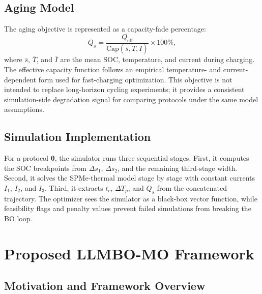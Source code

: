 \documentclass[journal]{IEEEtran}
\newcommand{\btheta}{\boldsymbol{\theta}}
\begin{document}
\subsection{Aging Model}

The aging objective is represented as a capacity-fade percentage:
\begin{equation}
Q_s=\frac{Q_{\mathrm{eff}}}
{\mathrm{Cap}(\bar{s},\bar{T},\bar{I})}\times 100\%,
\label{eq:aging}
\end{equation}
where $\bar{s}$, $\bar{T}$, and $\bar{I}$ are the mean SOC, temperature, and
current during charging. The effective capacity function follows an empirical
temperature- and current-dependent form used for fast-charging optimization.
This objective is not intended to replace long-horizon cycling experiments; it
provides a consistent simulation-side degradation signal for comparing
protocols under the same model assumptions.

\subsection{Simulation Implementation}

For a protocol $\btheta$, the simulator runs three sequential stages. First, it
computes the SOC breakpoints from $\Delta s_1$, $\Delta s_2$, and the remaining
third-stage width. Second, it solves the SPMe-thermal model stage by stage with
constant currents $I_1$, $I_2$, and $I_3$. Third, it extracts $t_c$,
$\Delta T_p$, and $Q_s$ from the concatenated trajectory. The optimizer sees
the simulator as a black-box vector function, while feasibility flags and
penalty values prevent failed simulations from breaking the BO loop.

\section{Proposed LLMBO-MO Framework}
\label{sec:method}

\subsection{Motivation and Framework Overview}
\end{document}
